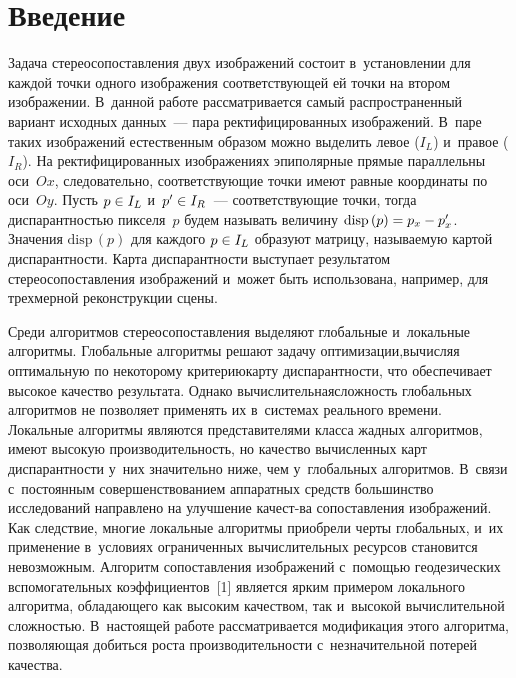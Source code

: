 \begin{multicols}{2}

\label{st\stat}

\section{Введение}

  Задача стереосопоставления двух изображений состоит в~установлении для 
каждой точки одного изображения соответствующей ей точки на втором\linebreak 
изображении. В~данной работе рассматривается самый распространенный 
вариант исходных данных~--- пара ректифицированных изображений. В~паре 
таких изображений естественным образом можно выделить левое ($I_L$) 
и~правое ($I_R$). На ректифицированных изображениях эпиполярные прямые 
параллельны оси~$Ox$, следовательно, соответствующие точки имеют равные 
координаты по оси~$Oy$. Пусть $p\hm\in I_L$ и~$p^\prime\hm\in I_R$~--- 
соответствующие точки, тогда диспарантностью пикселя~$p$ будем называть 
величину $\mathrm{disp}\,(p)\hm= p_x\hm-p^\prime_x$. Значения $\mathrm{disp}\,(p)$ для каждого 
$p\hm\in I_L$ образуют матрицу, называемую картой диспарантности. Карта 
диспарантности выступает результатом сте\-рео\-со\-по\-став\-ле\-ния изображений 
и~может быть использована, например, для трехмерной реконструкции сцены.
  
  Среди алгоритмов стереосопоставления выделяют глобальные и~локальные 
алгоритмы. Глобальные алгоритмы решают задачу оптимизации,\linebreak вы\-чис\-ляя 
оптимальную по некоторому критерию\linebreak карту диспарантности, что обеспечивает 
высокое качество результата. Однако вычислительная\linebreak сложность глобальных 
алгоритмов не позволяет применять их в~системах реального времени. 
Локальные алгоритмы являются представителями класса жадных алгоритмов, 
имеют высокую производительность, но качество вычисленных карт 
дис\-па\-рант\-ности у~них значительно ниже, чем у~глобальных алгоритмов. 
В~связи с~постоянным совершенствованием %
аппарат\-ных средств большинство 
исследований на\-прав\-ле\-но на улучшение качест-\linebreak ва
 сопоставления изображений. 
Как следствие, многие локальные алгоритмы приобрели черты глобальных, и~их 
применение в~условиях ограниченных вычислительных ресурсов становится 
невозможным. Алгоритм сопоставления изображений с~помощью 
геодезических вспомогательных коэффициентов~[1] является ярким примером 
локального алгоритма, %
обладающего как высоким качеством, так и~высокой 
вычислительной сложностью. В~настоящей работе рассматривается 
модификация этого алгоритма, позволяющая добиться роста 
производительности с~незначительной потерей качества.


\end{multicols}
